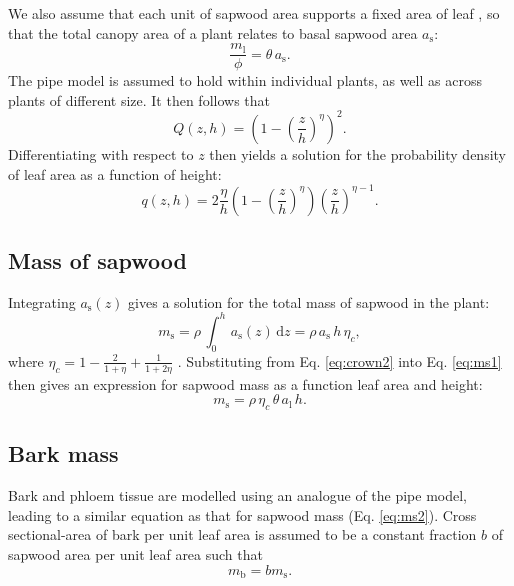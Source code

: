 \documentclass[10pt,twoside]{article}
\begin{document}
We also assume that each unit of sapwood area supports a fixed area of
leaf \citep[the pipe model][]{Shinozaki-1964}, so that the total canopy
area of a plant relates to basal sapwood area \(a_\textrm{s}\):
\begin{equation}\label{eq:crown2}
\frac{m_\textrm{l}}{\phi}= \theta \, a_\textrm{s}.
\end{equation}
The pipe model is assumed to hold within individual plants, as well as
across plants of different size. It then follows that
\begin{equation}\label{eq:crown1}
Q(z,h)= \left(1-\left(\frac{z}{h}\right)^\eta\right)^2.
\end{equation}
Differentiating with respect to \(z\) then yields a solution for the
probability density of leaf area as a function of height:
\begin{equation}\label{eq:crown3}
q(z,h)= 2\frac{\eta}{h}\left(1-\left(\frac{z}{h}\right)^{\eta}\right) \left(\frac{z}{h}\right)^{\eta-1}.
\end{equation}

\subsection{Mass of sapwood}\label{mass-of-sapwood}

Integrating \(a_\textrm{s}(z)\) gives a solution for the total mass of
sapwood in the plant:
\begin{equation}\label{eq:ms1}
m_\textrm{s}=\rho \, \int_0^h \, a_\textrm{s}(z) \, \textrm{d}z= \rho \, a_\textrm{s} \, h \, \eta_c, 
\end{equation}
where \(\eta_c=1-\frac{2}{1+\eta} + \frac{1}{1+2\eta}\)
\citep{Yokozawa-1995}. Substituting from Eq. \ref{eq:crown2} into Eq.
\ref{eq:ms1} then gives an expression for sapwood mass as a function
leaf area and height:
\begin{equation}\label{eq:ms2}
m_\textrm{s}=\rho \, \eta_c \, \theta \, a_\textrm{l} \, h.
\end{equation}

\subsection{Bark mass}\label{bark-mass}

Bark and phloem tissue are modelled using an analogue of the pipe model,
leading to a similar equation as that for sapwood mass (Eq.
\ref{eq:ms2}). Cross sectional-area of bark per unit leaf area is
assumed to be a constant fraction \(b\) of sapwood area per unit leaf
area such that
\begin{equation}\label{eq:mb}
m_\textrm{b}=b m_\textrm{s}.
\end{equation}
\end{document}
